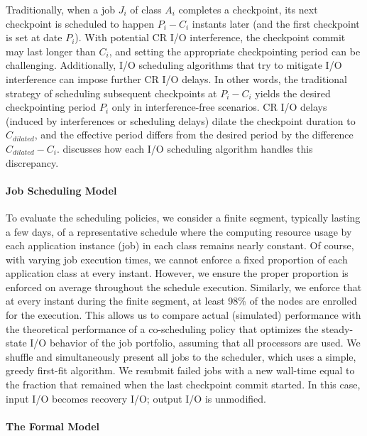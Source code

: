 \documentclass[conference,nofonttune]{IEEEtran}
\newcommand{\app}[1]{A_{#1}}
\newcommand{\period}[1]{P_{#1}}
\newcommand{\ckpt}[1]{C_{#1}}
\begin{document}
Traditionally, when a job $J_{i}$ of class $\app{i}$ completes a checkpoint, its next
checkpoint is scheduled to happen $\period{i}-\ckpt{i}$ instants later (and the first
checkpoint is set at date $\period{i}$). With potential CR I/O interference,
the checkpoint commit may last longer than $\ckpt{i}$, and setting
the appropriate checkpointing period can be challenging.
Additionally, I/O scheduling algorithms that try to mitigate I/O interference can
impose further CR I/O delays.  In other words, the traditional strategy of scheduling
subsequent checkpoints at $\period{i}-\ckpt{i}$ yields the desired checkpointing
period $\period{i}$ only in interference-free scenarios. CR I/O delays (induced by
interferences or scheduling delays) dilate the checkpoint duration to $C_{dilated}$,
and the effective period differs from the desired period by the difference
$C_{dilated}-\ckpt{i}$.   discusses how each I/O
scheduling algorithm handles this discrepancy.

\paragraph*{Job Scheduling Model}

To evaluate the scheduling policies, we consider a finite segment, typically
lasting a few days, of a representative schedule where the computing resource
usage by each application instance (job) in each class remains nearly constant.
Of course, with varying job execution times, we cannot enforce a fixed
proportion of each application class at every instant. However, we ensure the
proper proportion is enforced on average throughout the schedule execution.
Similarly, we enforce that at every instant during the finite segment, at least
98\% of the nodes are enrolled for the execution. This allows us to compare
actual (simulated) performance with the theoretical performance of a
co-scheduling policy that optimizes the steady-state I/O behavior of the job
portfolio, assuming that all processors are used. We shuffle and simultaneously
present all jobs to the scheduler, which uses a simple, greedy first-fit
algorithm.  We resubmit failed jobs with a new wall-time equal to the fraction
that remained when the last checkpoint commit started.  In this case, input I/O
becomes recovery I/O; output I/O is unmodified.

\paragraph*{The Formal Model}
\end{document}
